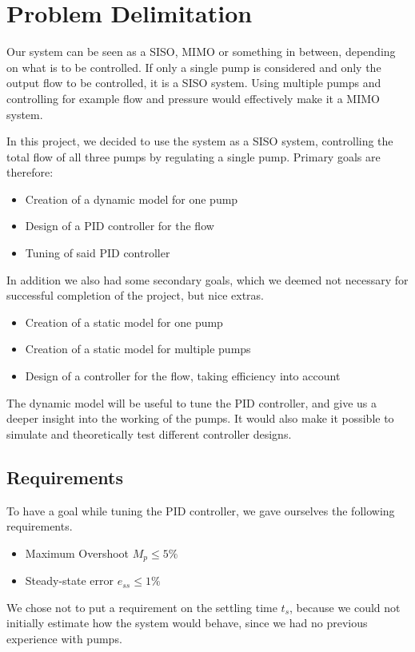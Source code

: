 \section{Problem Delimitation}
Our system can be seen as a SISO, MIMO or something in between,
depending on what is to be controlled.
If only a single pump is considered and only the output flow to be controlled,
it is a SISO system.
Using multiple pumps and controlling for example flow and pressure would effectively make it a MIMO system.

In this project,
we decided to use the system as a SISO system,
controlling the total flow of all three pumps by regulating a single pump.
Primary goals are therefore:

\begin{itemize}
\item Creation of a dynamic model for one pump
\item Design of a PID controller for the flow
\item Tuning of said PID controller 
\end{itemize}

In addition we also had some secondary goals,
which we deemed not necessary for successful completion of the project,
but nice extras.

\begin{itemize}
\item Creation of a static model for one pump
\item Creation of a static model for multiple pumps
\item Design of a controller for the flow, taking efficiency into account
\end{itemize}

The dynamic model will be useful to tune the PID controller,
and give us a deeper insight into the working of the pumps.
It would also make it possible to simulate and theoretically test different controller designs.


\subsection{Requirements}
To have a goal while tuning the PID controller,
we gave ourselves the following requirements.

\begin{itemize}
\item Maximum Overshoot $M_p \leq 5\%$
\item Steady-state error $e_{ss} \leq 1 \%$
\end{itemize}

We chose not to put a requirement on the settling time $t_s$,
because we could not initially estimate how the system would behave,
since we had no previous experience with pumps.